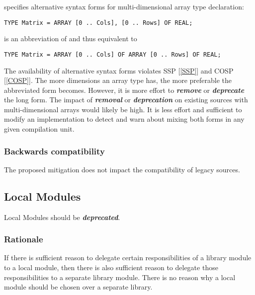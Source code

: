 \documentclass[10pt,a4paper]{article}
\renewcommand{\emph}[1]{\textbf{\textit{#1}}}
\begin{document}
\cite[p.138]{Wirth88} specifies alternative syntax forms for multi-dimensional array type declaration:

\lstset{style=modula2}
\begin{lstlisting}
TYPE Matrix = ARRAY [0 .. Cols], [0 .. Rows] OF REAL;
\end{lstlisting}

\noindent is an abbreviation of and thus equivalent to 
\lstset{style=modula2}
\begin{lstlisting}
TYPE Matrix = ARRAY [0 .. Cols] OF ARRAY [0 .. Rows] OF REAL;
\end{lstlisting}

\par\noindent The availability of alternative syntax forms violates
SSP [\ref{SSP}] and COSP [\ref{COSP}]. The more dimensions an array type has,
the more preferable the abbreviated form becomes. However, it is more effort
to \emph{remove} or \emph{deprecate} the long form. The impact of
\emph{removal} or \emph{deprecation} on existing sources with
multi-dimensional arrays would likely be high. It is less effort and
sufficient to modify an implementation to detect and warn about mixing
both forms in any given compilation unit.

\subsubsection{Backwards compatibility}

The proposed mitigation does not impact the compatibility of legacy sources.


\subsection{Local Modules}

Local Modules should be \emph{deprecated}.

\subsubsection{Rationale}
If there is sufficient reason to delegate certain responsibilities of a library
module to a local module, then there is also sufficient reason to delegate
those responsibilities to a separate library module. There is no reason why a
local module should be chosen over a separate library.
\end{document}

